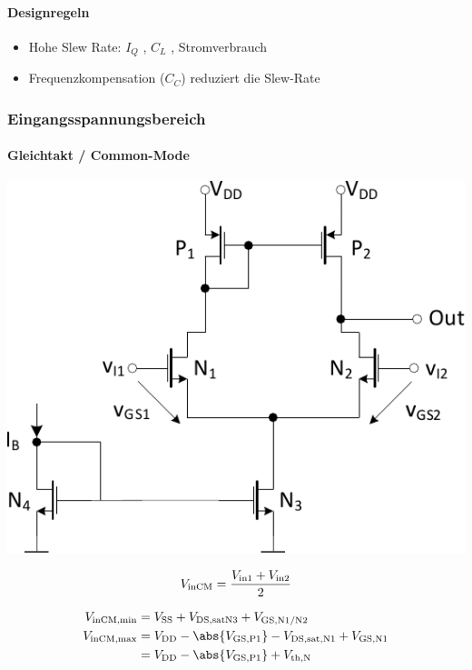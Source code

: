 \paragraph{Designregeln}
\begin{itemize}
    \item Hohe Slew Rate: $I_Q$ \textuparrow, $C_L$ \textdownarrow, Stromverbrauch \textuparrow%
    \item Frequenzkompensation ($C_C$) reduziert die Slew-Rate
\end{itemize}


\subsubsection{Eingangsspannungsbereich}
\paragraph{Gleichtakt / Common-Mode}

\begin{minipage}[t]{0.36\columnwidth}
    \includegraphics[width=\columnwidth, align=t]{images/09_common_mode_range.pdf}
\end{minipage}
\hfill
\begin{minipage}[t]{0.58\columnwidth}
    \[
        V_{\rm inCM} = \frac{V_{\rm in1} + V_{\rm in2}}{2}
    \]
    
    \vspace{-0.5cm}

    \begin{align*}
        V_{\rm inCM, min}   &= V_{\rm SS} + V_{\rm DS,satN3} + V_{\rm GS,N1/N2} \\
        V_{\rm inCM, max}   &= V_{\rm DD} - \abs{V_{\rm GS,P1}} - V_{\rm DS,sat,N1} + V_{\rm GS,N1} \\
                            &= V_{\rm DD} - \abs{V_{\rm GS,P1}} + V_{\rm th,N} 
    \end{align*}
\end{minipage}

